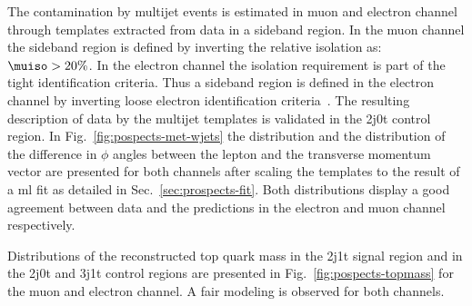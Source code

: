 

The contamination by multijet events is estimated in muon and electron channel through templates extracted from data in a sideband region. In the muon channel the sideband region is defined by inverting the relative isolation as: $\muiso>20\%$. In the electron channel the isolation requirement is part of the tight identification criteria. Thus a sideband region is defined in the electron channel by inverting loose electron identification criteria~\cite{CMS-DP-2017-004}. The resulting description of data by the multijet templates is validated in the 2j0t control region. In Fig.~\ref{fig:pospects-met-wjets} the \met distribution and the distribution of the difference in $\phi$ angles between the lepton and the transverse momentum vector are presented for both channels after scaling the templates to the result of a \gls{ml} fit as detailed in Sec.~\ref{sec:prospects-fit}. Both distributions display a good agreement between data and the predictions in the electron and muon channel respectively.

Distributions of the reconstructed top quark mass in the 2j1t signal region and in the 2j0t \wjets and 3j1t \ttbar control regions are presented in Fig.~\ref{fig:pospects-topmass} for the muon and electron channel. A fair modeling is observed for both channels.



